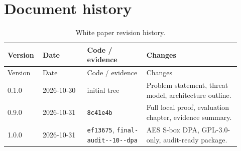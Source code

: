 \documentclass[11pt,a4paper]{article}
\newcommand{\evidencetag}{\texttt{final-\allowbreak audit-\allowbreak 2026-10-\allowbreak 31-\allowbreak dpa}}
\newcommand{\code}[1]{\texttt{#1}}
\theoremstyle{plain}
\theoremstyle{definition}
\theoremstyle{remark}
\begin{document}
\section{Document history}

\small
\begin{longtable}{@{}p{0.12\linewidth}p{0.18\linewidth}p{0.24\linewidth}p{0.38\linewidth}@{}}
\caption{White paper revision history.}\label{tab:history}\\
\toprule
Version & Date & Code / evidence & Changes \\
\midrule
\endfirsthead
\toprule
Version & Date & Code / evidence & Changes \\
\midrule
\endhead
0.1.0 & 2026-10-30 & initial tree & Problem statement, threat model, architecture outline. \\
0.9.0 & 2026-10-31 & \code{8c41e4b} & Full local proof, evaluation chapter, evidence summary. \\
1.0.0 & 2026-10-31 & \code{ef13675}, \evidencetag & AES S-box DPA, GPL-3.0-only, audit-ready package. \\
\bottomrule
\end{longtable}



\end{document}
